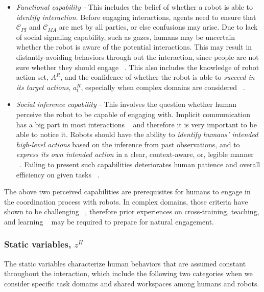 \documentclass[letterpaper, 10 pt, conference]{ieeeconf}  %
\begin{document}
\begin{itemize}
	\item \textit{Functional capability - } This includes the belief of whether a robot is able to \textit{identify interaction}. Before engaging interactions, agents need to ensure that $\mathcal{C}_{PI}$ and $\mathcal{C}_{MA}$ are met by all parties, or else confusions may arise. Due to lack of social signaling capability, such as gazes, humans may be uncertain whether the robot is aware of the potential interactions. This may result in distantly-avoiding behaviors through out the interaction, since people are not sure whether they should engage ~\cite{dragan2015effects}. This also includes the knowledge of robot action set, $A^R$, and the confidence of whether the robot is able to \textit{succeed in its target actions}, $a^R_t$, especially when complex domains are considered ~\cite{chen2018planning}. 
	\item \textit{Social inference capability - } This involves the question whether human perceive the robot to be capable of engaging with. Implicit communication has a big part in most interactions ~\cite{knepper2017implicit} and therefore it is very important to be able to notice it. Robots should have the ability to \textit{identify humans' intended high-level actions} based on the inference from past observations, and to \textit{express its own intended action} in a clear, context-aware, or, legible manner ~\cite{dragan2013legibility}. Failing to present such capabilities deteriorates human patience and overall efficiency on given tasks ~\cite{cha2015perceived}. 
\end{itemize}

The above two perceived capabilities are prerequisites for humans to engage in the coordination process with robots. In complex domains, those criteria have shown to be challenging ~\cite{knepper2017implicit}, therefore prior experiences on cross-training, teaching, and learning ~\cite{zhang2017plan} may be required to prepare for natural engagement. 

\subsubsection{Static variables, $z^H$}
The static variables characterize human behaviors that are assumed constant 
throughout the interaction, which include the following two categories when we 
consider specific task domains and shared workspaces among humans and robots. 
\end{document}
